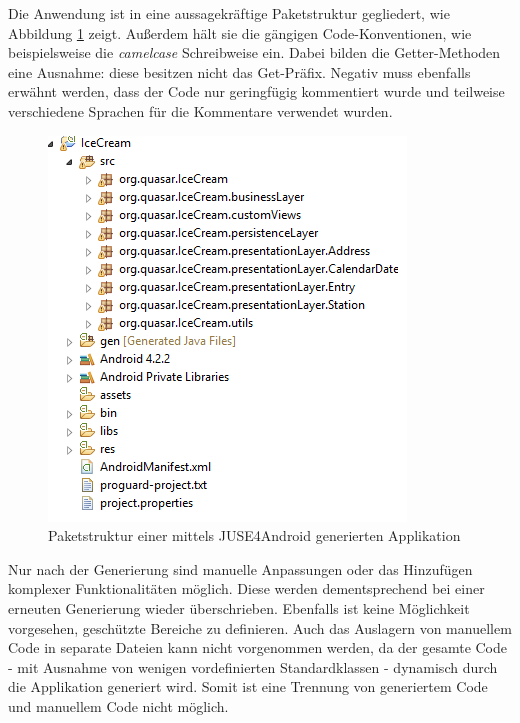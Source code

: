 \documentclass[a4paper,twoside]{article}
\begin{document}
Die Anwendung ist in eine aussagekräftige Paketstruktur gegliedert, wie Abbildung \ref{fig:Grafik4} zeigt. Außerdem hält sie die gängigen Code-Konventionen, wie beispielsweise die \textit{camelcase} Schreibweise ein. Dabei bilden die Getter-Methoden eine Ausnahme: diese besitzen nicht das Get-Präfix. Negativ muss ebenfalls erwähnt werden, dass der Code nur geringfügig kommentiert wurde und teilweise verschiedene Sprachen für die Kommentare verwendet wurden. %
\begin{figure}[!h]
	\centering
	\includegraphics[scale=.6]{pics/Paket.png}
	\caption{Paketstruktur einer mittels JUSE4Android generierten Applikation}
	\label{fig:Grafik4}
\end{figure}
Nur nach der Generierung sind manuelle Anpassungen oder das Hinzufügen komplexer Funktionalitäten möglich. Diese werden dementsprechend bei einer erneuten Generierung wieder überschrieben. Ebenfalls ist keine Möglichkeit vorgesehen, geschützte Bereiche zu definieren. Auch das Auslagern von manuellem Code in separate Dateien kann nicht vorgenommen werden, da der gesamte Code - mit Ausnahme von wenigen vordefinierten Standardklassen - dynamisch durch die Applikation generiert wird. Somit ist eine Trennung von generiertem Code und manuellem Code nicht möglich. 
\end{document}
